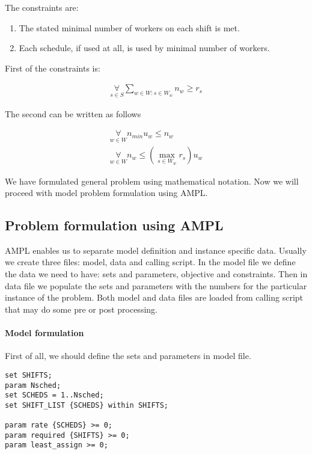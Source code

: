 The constraints are:

\begin{enumerate}
  \item The stated minimal number of workers on each shift is met.
  \item Each schedule, if used at all, is used by minimal number of workers.
\end{enumerate}

First of the constraints is: 

\begin{align}
   \mathop\forall\limits_{s \in S}
     \mathop\sum\limits_{w \in W: s \in W_w} n_w \geq r_s
\end{align}

The second can be written as follows

\begin{align}
   \mathop\forall\limits_{w \in W}
     n_{min} u_w \leq n_w \\
   \mathop\forall\limits_{w \in W}
     n_w \leq \left(\max\limits_{s \in W_w} r_s\right) u_w 
\end{align}

We have formulated general problem using mathematical notation. Now we will proceed with model problem formulation using AMPL.

\subsection{Problem formulation using AMPL}
AMPL enables us to separate model definition and instance specific data. Usually we create three files: model, data and calling script. In the model file we define the data we need to have: sets and parameters, objective and constraints. Then in data file we populate the sets and parameters with the numbers for the particular instance of the problem. Both model and data files are loaded from calling script that may do some pre or post processing.

\paragraph{Model formulation}

First of all, we should define the sets and parameters in model file.

\begin{lstlisting}
set SHIFTS;
param Nsched;
set SCHEDS = 1..Nsched;
set SHIFT_LIST {SCHEDS} within SHIFTS;

param rate {SCHEDS} >= 0;
param required {SHIFTS} >= 0;
param least_assign >= 0;
\end{lstlisting}

